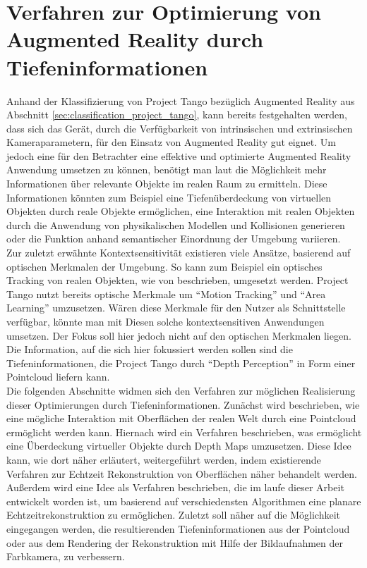 \chapter{Verfahren zur Optimierung von Augmented Reality durch Tiefeninformationen}

Anhand der Klassifizierung von Project Tango bezüglich Augmented Reality aus Abschnitt \ref{sec:classification_project_tango}, kann bereits festgehalten werden, dass sich das Gerät, durch die Verfügbarkeit von intrinsischen und extrinsischen Kameraparametern, für den Einsatz von Augmented Reality gut eignet. Um jedoch eine für den Betrachter eine effektive und optimierte Augmented Reality Anwendung umsetzen zu können, benötigt man laut \citet{azuma2001recent} die Möglichkeit mehr Informationen über relevante Objekte im realen Raum zu ermitteln. Diese Informationen könnten zum Beispiel eine Tiefenüberdeckung von virtuellen Objekten durch reale Objekte ermöglichen, eine Interaktion mit realen Objekten durch die Anwendung von physikalischen Modellen und Kollisionen generieren oder die Funktion anhand semantischer Einordnung der Umgebung variieren. \\

Zur zuletzt erwähnte Kontextsensitivität existieren viele Ansätze, basierend auf optischen Merkmalen der Umgebung. So kann zum Beispiel ein optisches Tracking von realen Objekten, wie von \citet{lee2008hybrid} beschrieben, umgesetzt werden. Project Tango nutzt bereits optische Merkmale um \enquote{Motion Tracking} und \enquote{Area Learning} umzusetzen. Wären diese Merkmale für den Nutzer als Schnittstelle verfügbar, könnte man mit Diesen solche kontextsensitiven Anwendungen umsetzen. Der Fokus soll hier jedoch nicht auf den optischen Merkmalen liegen. Die Information, auf die sich hier fokussiert werden sollen sind die Tiefeninformationen, die Project Tango durch \enquote{Depth Perception} in Form einer Pointcloud liefern kann.\\

Die folgenden Abschnitte widmen sich den Verfahren zur möglichen Realisierung dieser Optimierungen durch Tiefeninformationen. Zunächst wird beschrieben, wie eine mögliche Interaktion mit Oberflächen der realen Welt durch eine Pointcloud ermöglicht werden kann. Hiernach wird ein Verfahren beschrieben, was ermöglicht eine Überdeckung virtueller Objekte durch Depth Maps umzusetzen. Diese Idee kann, wie dort näher erläutert, weitergeführt werden, indem existierende Verfahren zur Echtzeit Rekonstruktion von Oberflächen näher behandelt werden. Außerdem wird eine Idee als Verfahren beschrieben, die im laufe dieser Arbeit entwickelt worden ist, um basierend auf verschiedensten Algorithmen eine planare Echtzeitrekonstruktion zu ermöglichen. Zuletzt soll näher auf die Möglichkeit eingegangen werden, die resultierenden Tiefeninformationen aus der Pointcloud oder aus dem Rendering der Rekonstruktion mit Hilfe der Bildaufnahmen der Farbkamera, zu verbessern. \\

